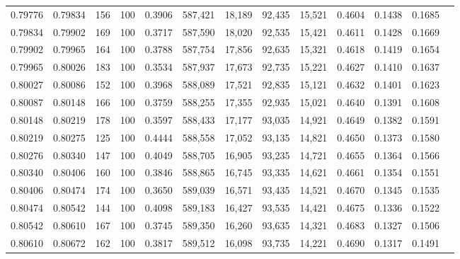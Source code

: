 \begin{tabular}{rrrrrrrrrrrrr}
0.79776 & 0.79834 &   156 & 100 &                                     0.3906 & 587,421 &  18,189 &  92,435 &  15,521 & 0.4604 & 0.1438 & 0.1685 \\
0.79834 & 0.79902 &   169 & 100 &                                     0.3717 & 587,590 &  18,020 &  92,535 &  15,421 & 0.4611 & 0.1428 & 0.1669 \\
0.79902 & 0.79965 &   164 & 100 &                                     0.3788 & 587,754 &  17,856 &  92,635 &  15,321 & 0.4618 & 0.1419 & 0.1654 \\
0.79965 & 0.80026 &   183 & 100 &                                     0.3534 & 587,937 &  17,673 &  92,735 &  15,221 & 0.4627 & 0.1410 & 0.1637 \\
0.80027 & 0.80086 &   152 & 100 &                                     0.3968 & 588,089 &  17,521 &  92,835 &  15,121 & 0.4632 & 0.1401 & 0.1623 \\
0.80087 & 0.80148 &   166 & 100 &                                     0.3759 & 588,255 &  17,355 &  92,935 &  15,021 & 0.4640 & 0.1391 & 0.1608 \\
0.80148 & 0.80219 &   178 & 100 &                                     0.3597 & 588,433 &  17,177 &  93,035 &  14,921 & 0.4649 & 0.1382 & 0.1591 \\
0.80219 & 0.80275 &   125 & 100 &                                     0.4444 & 588,558 &  17,052 &  93,135 &  14,821 & 0.4650 & 0.1373 & 0.1580 \\
0.80276 & 0.80340 &   147 & 100 &                                     0.4049 & 588,705 &  16,905 &  93,235 &  14,721 & 0.4655 & 0.1364 & 0.1566 \\
0.80340 & 0.80406 &   160 & 100 &                                     0.3846 & 588,865 &  16,745 &  93,335 &  14,621 & 0.4661 & 0.1354 & 0.1551 \\
0.80406 & 0.80474 &   174 & 100 &                                     0.3650 & 589,039 &  16,571 &  93,435 &  14,521 & 0.4670 & 0.1345 & 0.1535 \\
0.80474 & 0.80542 &   144 & 100 &                                     0.4098 & 589,183 &  16,427 &  93,535 &  14,421 & 0.4675 & 0.1336 & 0.1522 \\
0.80542 & 0.80610 &   167 & 100 &                                     0.3745 & 589,350 &  16,260 &  93,635 &  14,321 & 0.4683 & 0.1327 & 0.1506 \\
0.80610 & 0.80672 &   162 & 100 &                                     0.3817 & 589,512 &  16,098 &  93,735 &  14,221 & 0.4690 & 0.1317 & 0.1491 \\

\end{tabular}
